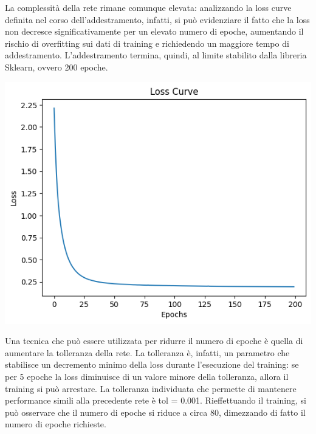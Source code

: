 La complessità della rete rimane comunque elevata: analizzando la loss curve
definita nel corso dell'addestramento, infatti, si può evidenziare il fatto
che la loss non decresce significativamente per un elevato numero di epoche,
aumentando il rischio di overfitting sui dati di training e richiedendo un maggiore
tempo di addestramento. L'addestramento termina, quindi, al limite stabilito
dalla libreria Sklearn, ovvero 200 epoche.

\begin{Figure}
    \centering
    \includegraphics[width=0.9\linewidth]{img/mlp_low_loss.png}
\end{Figure}

Una tecnica che può essere utilizzata per ridurre il numero di epoche
è quella di aumentare la tolleranza della rete.
La tolleranza è, infatti, un parametro che stabilisce un decremento minimo
della loss durante l'esecuzione del training: se per 5 epoche la loss
diminuisce di un valore minore della tolleranza, allora il training si può
arrestare.
La tolleranza individuata che permette di mantenere performance simili alla
precedente rete è tol = 0.001. Rieffettuando il training, si può osservare che 
il numero di epoche si riduce a circa 80, dimezzando di fatto il numero
di epoche richieste.

